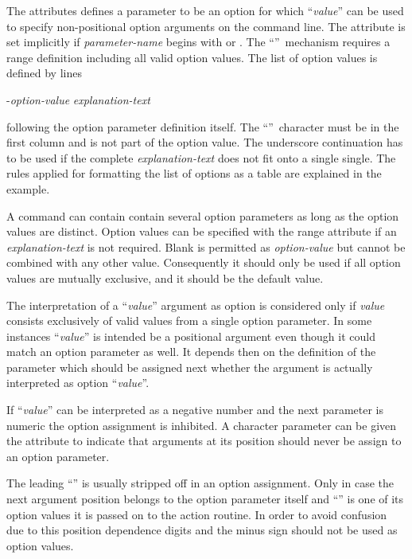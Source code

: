 The  attributes defines a parameter to be an option for
which ``\Lit{-}\textsl{value}'' can be used to specify non-positional
option arguments on the command line.
The  attribute is set implicitly
if \textsl{parameter-name} begins with  or .
The ``\Lit{-}''~mechanism requires a range definition including all
valid option values.
The list of option values is defined by lines
\begin{XMP} 
-\textsl{option-value} \quad \textsl{explanation-text}
\end{XMP}
following the option parameter definition itself.
The ``\Lit{-}''~character must be in the first column and is not part
of the option value.
The underscore continuation has to be used if the complete 
\textsl{explanation-text} does not fit onto a single single.
The rules applied for formatting the list of options as a table are
explained in the example. 

A command can contain contain several option parameters as long as the
option values are distinct.
Option values can be specified with the range attribute
if an \textsl{explanation-text} is not required.
Blank is permitted as \textsl{option-value} but cannot be combined with
any other value.
Consequently it should only be used if all option values are mutually
exclusive, and it should be the default value.

The interpretation of a ``\Lit{-}\textsl{value}'' argument as option
is considered only if \textsl{value} consists
exclusively of valid values from a single option parameter.
In some instances ``\Lit{-}\textsl{value}'' is intended be a positional
argument even though it could match an option parameter as well.
It depends then on the definition of the parameter which
should be assigned next whether the argument is actually interpreted
as option ``\textsl{value}''.

If ``\Lit{-}\textsl{value}'' can be interpreted as a negative number
and the next parameter is numeric the option assignment is inhibited.
A character parameter can be given the  attribute to
indicate that arguments at its position should never be assign to an
option parameter.

The leading ``\Lit{-}'' is usually stripped off in an option
assignment. 
Only in case the next argument position belongs to the option
parameter itself and ``\Lit{-}'' is one of its option values
it is passed on to the action routine.
In order to avoid confusion due to this position dependence digits and
the minus sign should not be used as option values.


